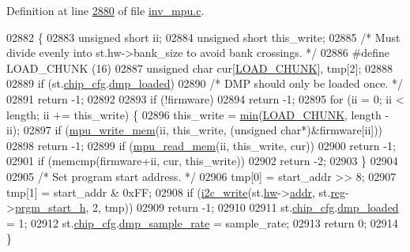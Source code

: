 Definition at line \hyperlink{inv__mpu_8c_source_l02880}{2880} of file \hyperlink{inv__mpu_8c_source}{inv\+\_\+mpu.\+c}.


\begin{DoxyCode}
02882 \{
02883     \textcolor{keywordtype}{unsigned} \textcolor{keywordtype}{short} ii;
02884     \textcolor{keywordtype}{unsigned} \textcolor{keywordtype}{short} this\_write;
02885     \textcolor{comment}{/* Must divide evenly into st.hw->bank\_size to avoid bank crossings. */}
02886 \textcolor{preprocessor}{#define LOAD\_CHUNK  (16)}
02887     \textcolor{keywordtype}{unsigned} \textcolor{keywordtype}{char} cur[\hyperlink{inv__mpu_8c_a7750730ae7e5c713b619e347d44185fe}{LOAD\_CHUNK}], tmp[2];
02888 
02889     \textcolor{keywordflow}{if} (st.\hyperlink{structgyro__state__s_ac895217592e2084bd520b0be8e9d20ee}{chip\_cfg}.\hyperlink{structchip__cfg__s_afc32c3e58317c589014257dc9b1ee04b}{dmp\_loaded})
02890         \textcolor{comment}{/* DMP should only be loaded once. */}
02891         \textcolor{keywordflow}{return} -1;
02892 
02893     \textcolor{keywordflow}{if} (!firmware)
02894         \textcolor{keywordflow}{return} -1;
02895     \textcolor{keywordflow}{for} (ii = 0; ii < length; ii += this\_write) \{
02896         this\_write = \hyperlink{group___d_r_i_v_e_r_s_gac6afabdc09a49a433ee19d8a9486056d}{min}(\hyperlink{inv__mpu_8c_a7750730ae7e5c713b619e347d44185fe}{LOAD\_CHUNK}, length - ii);
02897         \textcolor{keywordflow}{if} (\hyperlink{group___d_r_i_v_e_r_s_gafea59910bc3dd30ba3356b1c75213a5f}{mpu\_write\_mem}(ii, this\_write, (\textcolor{keywordtype}{unsigned} \textcolor{keywordtype}{char}*)&firmware[ii]))
02898             \textcolor{keywordflow}{return} -1;
02899         \textcolor{keywordflow}{if} (\hyperlink{group___d_r_i_v_e_r_s_ga3374bececb6743893c9eab27645c1182}{mpu\_read\_mem}(ii, this\_write, cur))
02900             \textcolor{keywordflow}{return} -1;
02901         \textcolor{keywordflow}{if} (memcmp(firmware+ii, cur, this\_write))
02902             \textcolor{keywordflow}{return} -2;
02903     \}
02904 
02905     \textcolor{comment}{/* Set program start address. */}
02906     tmp[0] = start\_addr >> 8;
02907     tmp[1] = start\_addr & 0xFF;
02908     \textcolor{keywordflow}{if} (\hyperlink{_i2_c_8c_ac0f145afe8d662af199043939f4398d6}{i2c\_write}(st.\hyperlink{structgyro__state__s_a5bac30a96752691e4cc723735060e360}{hw}->\hyperlink{structhw__s_a4c34a946600e9d68b6355d23f54d291b}{addr}, st.\hyperlink{structgyro__state__s_ae857e1285c583b7438a208edd691a38e}{reg}->\hyperlink{structgyro__reg__s_a0813e85e389743e828cc84c5b903ada1}{prgm\_start\_h}, 2, tmp))
02909         \textcolor{keywordflow}{return} -1;
02910 
02911     st.\hyperlink{structgyro__state__s_ac895217592e2084bd520b0be8e9d20ee}{chip\_cfg}.\hyperlink{structchip__cfg__s_afc32c3e58317c589014257dc9b1ee04b}{dmp\_loaded} = 1;
02912     st.\hyperlink{structgyro__state__s_ac895217592e2084bd520b0be8e9d20ee}{chip\_cfg}.\hyperlink{structchip__cfg__s_a5d17c6049cc8cb74faf5cdb942988294}{dmp\_sample\_rate} = sample\_rate;
02913     \textcolor{keywordflow}{return} 0;
02914 \}
\end{DoxyCode}
